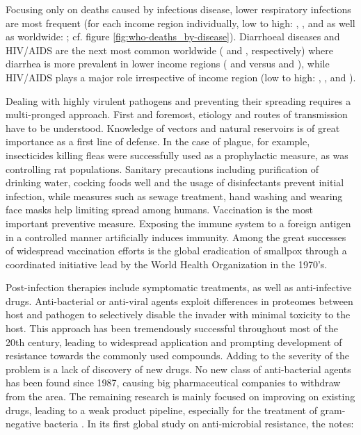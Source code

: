 

Focusing only on deaths caused by infectious disease, lower respiratory infections are most frequent (for each income region individually, low to high: \knitrPercentageInfectTwelveLowLRI{}, \knitrPercentageInfectTwelveLmidLRI{}, \knitrPercentageInfectTwelveUmidLRI{} and \knitrPercentageInfectTwelveHighLRI{} as well as worldwide: \knitrPercentageInfectTwelveWorldLRI{}; cf. figure \ref{fig:who-deaths_by-disease}). Diarrhoeal diseases and HIV/AIDS are the next most common worldwide (\knitrPercentageInfectTwelveWorldDiarr{} and \knitrPercentageInfectTwelveWorldAIDS{}, respectively) where diarrhea is more prevalent in lower income regions (\knitrPercentageInfectTwelveLowDiarr{} and \knitrPercentageInfectTwelveLmidDiarr{} versus \knitrPercentageInfectTwelveUmidDiarr{} and \knitrPercentageInfectTwelveHighDiarr{}), while HIV/AIDS plays a major role irrespective of income region (low to high: \knitrPercentageInfectTwelveLowAIDS{}, \knitrPercentageInfectTwelveLmidAIDS{}, \knitrPercentageInfectTwelveUmidAIDS{} and \knitrPercentageInfectTwelveHighAIDS{}).

Dealing with highly virulent pathogens and preventing their spreading requires a multi-pronged approach. First and foremost, etiology and routes of transmission have to be understood. Knowledge of vectors and natural reservoirs is of great importance as a first line of defense. In the case of plague, for example, insecticides killing fleas were successfully used as a prophylactic measure, as was controlling rat populations. Sanitary precautions including purification of drinking water, cocking foods well and the usage of disinfectants prevent initial infection, while measures such as sewage treatment, hand washing and wearing face masks help limiting spread among humans. Vaccination is the most important preventive measure. Exposing the immune system to a foreign antigen in a controlled manner artificially induces immunity. Among the great successes of widespread vaccination efforts is the global eradication of smallpox through a coordinated initiative lead by the World Health Organization in the 1970's.

Post-infection therapies include symptomatic treatments, as well as anti-in\-fec\-tive drugs. Anti-bacterial or anti-viral agents exploit differences in proteomes between host and pathogen to selectively disable the invader with minimal toxicity to the host. This approach has been tremendously successful throughout most of the 20th century, leading to widespread application and prompting development of resistance towards the commonly used compounds. Adding to the severity of the problem is a lack of discovery of new drugs. No new class of anti-bacterial agents has been found since 1987, causing big pharmaceutical companies to withdraw from the area. The remaining research is mainly focused on improving on existing drugs, leading to a weak product pipeline, especially for the treatment of gram-negative bacteria \citep{Silver2011}. In its first global study on anti-microbial resistance, the \cite{WHO2014} notes:

